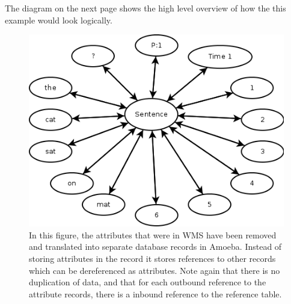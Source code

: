 \documentclass[11pt]{article}
\begin{document}
\newline
The diagram on the next page shows the high level overview of how the this example would look logically.
\newpage
\noindent
\begin{figure}[ht]
\centering
\includegraphics[scale=0.5]{WMS2Amoeba2.png}
\caption{In this figure, the attributes that were in WMS have been removed and translated into separate database records in Amoeba. Instead of storing attributes in the record it stores references to other records which can be dereferenced as attributes. Note again that there is no duplication of data, and that for each outbound reference to the attribute records, there is a inbound reference to the reference table.}
\end{figure}
\end{document}
